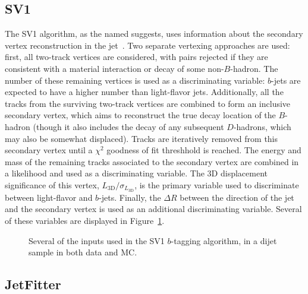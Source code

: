 

\subsection{SV1}

The SV1 algorithm, as the named suggests, uses information about the secondary vertex reconstruction in the jet~\cite{ATLAS-B}. Two separate vertexing approaches are used: first, all two-track vertices are considered, with pairs rejected if they are consistent with a material interaction or decay of some non-$B$-hadron. The number of these remaining vertices is used as a discriminating variable: $b$-jets are expected to have a higher number than light-flavor jets. Additionally, all the tracks from the surviving two-track vertices are combined to form an inclusive secondary vertex, which aims to reconstruct the true decay location of the $B$-hadron (though it also includes the decay of any subsequent $D$-hadrons, which may also be somewhat displaced). Tracks are iteratively removed from this secondary vertex until a $\chi^2$ goodness of fit threshhold is reached. The energy and mass of the remaining tracks associated to the secondary vertex are combined in a likelihood and used as a discriminating variable. The 3D displacement significance of this vertex, $L_{\mathrm{3D}} / \sigma_{L_\mathrm{3D}}$, is the primary variable used to discriminate between light-flavor and $b$-jets. Finally, the $\Delta R$ between the direction of the jet and the secondary vertex is used as an additional discriminating variable. Several of these variables are displayed in Figure~\ref{fig:jet-reconstruction:b-tagging:sv1}. 


\begin{figure}
\centering
{}
\caption{Several of the inputs used in the SV1 $b$-tagging algorithm, in a dijet sample in both data and MC.}
\label{fig:jet-reconstruction:b-tagging:sv1}
\end{figure}


\subsection{JetFitter}

